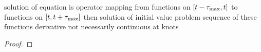 \cite{Roussel04DDEs}
solution of equation is operator mapping from functions on $[t-\tau_{\max},t]$ to functions on $[t,t+\tau_{\max}]$
then solution of initial value problem sequence of these functions
derivative not necessarily continuous at knots


\begin{lemma}
    \label{lemma-continuity}

\end{lemma}

\begin{proof}
\end{proof}


